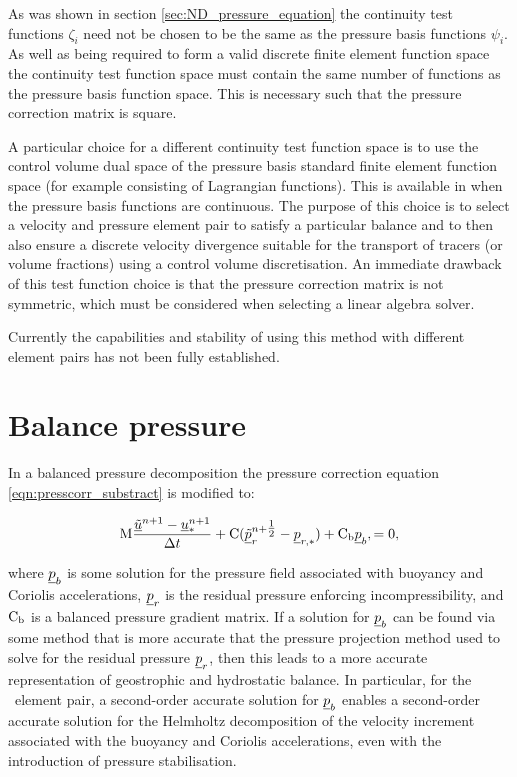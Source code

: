 As was shown in section \ref{sec:ND_pressure_equation} the continuity test functions
$\zeta_{i}$ need not be chosen to be the same as the pressure basis functions $\psi_{i}$.
As well as being required to form a valid discrete finite element function space the continuity
test function space must contain the same number of functions as the pressure basis function space.
This is necessary such that the pressure correction matrix is square.

A particular choice for a different continuity test function space is to use the control volume dual
space of the pressure basis standard finite element function space (for example consisting of Lagrangian
functions). This is available in \fluidity when the pressure basis functions are continuous. The purpose of this
choice is to select a velocity and pressure element pair to satisfy a particular balance and to
then also ensure a discrete velocity divergence suitable for the transport of tracers (or volume fractions)
using a control volume discretisation. An immediate drawback of this test function choice is that
the pressure correction matrix is not symmetric, which must be considered when selecting a linear algebra solver.

Currently the capabilities and stability of using this method with different element pairs has not been fully
established.

\section{Balance pressure}
\label{sec:balance_pressure}

In a balanced pressure decomposition the pressure correction equation \eqref{eqn:presscorr_substract}
is modified to:

\begin{equation}\label{eqn:bp_projection}
\mathrm{M}  \frac{{\underline{\tilde u}^{n+1}-\underline{u}_*^{n+1}}}{\Delta t}
    + \mathrm{C} ( \underline{\tilde p}_r^{n+\tfrac 12} - \underline{p}_{r,*}) + \mathrm{C_b} \underline{p}_b,
    =0,
\end{equation}

where $\underline{p}_b$ is some solution for the pressure field associated with buoyancy
and Coriolis accelerations, $\underline{p}_r$ is the residual pressure enforcing
incompressibility, and $\mathrm{C_b}$ is a balanced pressure
gradient matrix. If a solution for $\underline{p}_b$ can be found via some method that
is more accurate that the pressure projection method used to solve for the
residual pressure $\underline{p}_r$, then this leads to a more accurate representation of
geostrophic and hydrostatic balance. In particular, for the \Poo\
element pair, a second-order accurate solution
for $\underline{p}_b$ enables a second-order accurate solution for the Helmholtz decomposition
of the velocity increment associated with the buoyancy and Coriolis accelerations, even with the introduction of
pressure stabilisation.

